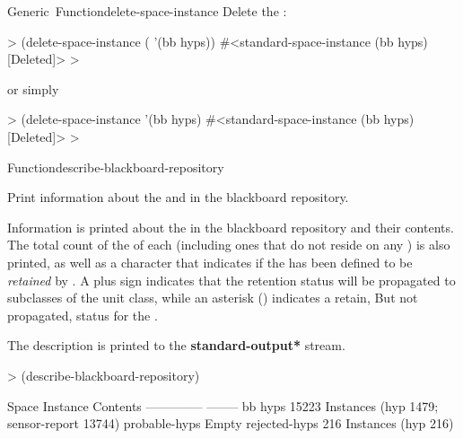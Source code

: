 \documentclass[10pt,twoside,english,pdftex]{article}
\begin{document}
\begin{functiondoc}{Generic~Function}{delete-space-instance}
\fnexamples
{}%
Delete the  :
%
\W\supp
\begin{example}
  > (delete-space-instance ( '(bb hyps))
  #<standard-space-instance (bb hyps) [Deleted]>
  >
\end{example}
%
or simply
%
\W\supp\notpretop
\begin{example}
  > (delete-space-instance '(bb hyps)
  #<standard-space-instance (bb hyps) [Deleted]>
  >
\end{example}

\end{functiondoc}


\begin{functiondoc}{Function}{describe-blackboard-repository}{\noargs}

\fnsyntax

\fnpurpose {}%
%
%
Print information about the  and  in the
blackboard repository.

\fnpackage {}

\fnmodule {}

\fndescription
{}%
%
Information is printed about the  in the blackboard
repository and their contents.  The total count of the
 of each  (including ones that
do not reside on any ) is also printed, as well
as a character that indicates if the  has been
defined to be \textit{retained} by
\textbf{}.  A plus sign
indicates that the retention status will be propagated to subclasses
of the unit class, while an asterisk (\code{*}) indicates a retain,
But not propagated, status for the .

The description is printed to the {\bf *standard-output*} stream.

\fnexample
%
\W\supp
\begin{example}
  > (describe-blackboard-repository)

  Space Instance              Contents
  --------------              --------
  bb                            
     hyps                     15223 Instances (hyp 1479; sensor-report 13744)
     probable-hyps            Empty
     rejected-hyps            216 Instances (hyp 216)


\end{example}
\end{functiondoc}
\end{document}
